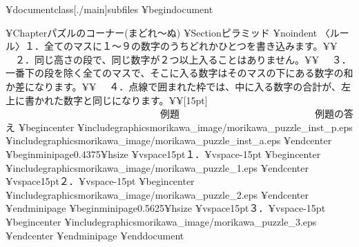 ¥documentclass[./main]{subfiles}
¥begin{document}

¥Chapter{パズルのコーナー(まどれ〜ぬ)} 
¥Section{ピラミッド}
¥noindent 〈ルール〉１．全てのマスに１〜９の数字のうちどれかひとつを書き込みます。¥¥
　２．同じ高さの段で、同じ数字が２つ以上入ることはありません。¥¥
　３．一番下の段を除く全てのマスで、そこに入る数字はそのマスの下にある数字の和か差になります。¥¥
　４．点線で囲まれた枠では、中に入る数字の合計が、左上に書かれた数字と同じになります。¥¥[15pt]
　　　　　　　　　　　　　　　　例題　　　　　　　　　　　　　　例題の答え
¥begin{center}
¥includegraphics{morikawa_image/morikawa_puzzle_inst_p.eps}　　　　　
¥includegraphics{morikawa_image/morikawa_puzzle_inst_a.eps}
¥end{center}
¥begin{minipage}{0.4375¥hsize}
¥vspace{15pt}１．¥vspace{-15pt}
¥begin{center}
¥includegraphics{morikawa_image/morikawa_puzzle_1.eps}
¥end{center}
¥vspace{15pt}２．¥vspace{-15pt}
¥begin{center}
¥includegraphics{morikawa_image/morikawa_puzzle_2.eps}
¥end{center}
¥end{minipage}
¥begin{minipage}{0.5625¥hsize}
¥vspace{15pt}３．¥vspace{-15pt}
¥begin{center}
¥includegraphics{morikawa_image/morikawa_puzzle_3.eps}
¥end{center}
¥end{minipage}
¥end{document}

